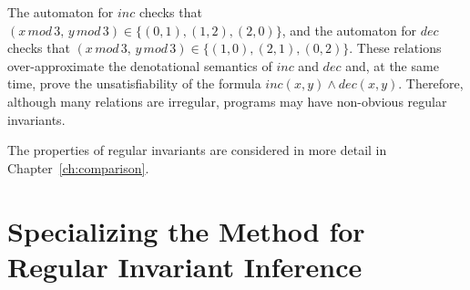 \begin{example}
The automaton for $ inc $ checks that $ (x \, \mathit{mod} \, 3, \, y \, \mathit{mod} \, 3) \in \{(0,1), (1 , 2 ), (2,0) \} $, and the automaton for $ dec $ checks that $ (x \, \mathit{mod} \, 3, \, y \, \mathit{mod} \, 3) \in \{(1,0),(2,1),(0,2)\}$. These relations over-approximate the denotational semantics of $inc$ and $dec$ and, at the same time, prove the unsatisfiability of the formula $inc(x, y) \land dec(x, y)$.
Therefore, although many relations are irregular, programs may have non-obvious regular invariants.
\end{example}

The properties of regular invariants are considered in more detail in Chapter~\cref{ch:comparison}.


\section{Specializing the Method for Regular Invariant Inference}\label{sec:fmf/specRegular}

\newworkflowWithTestersAndSelectors{}


